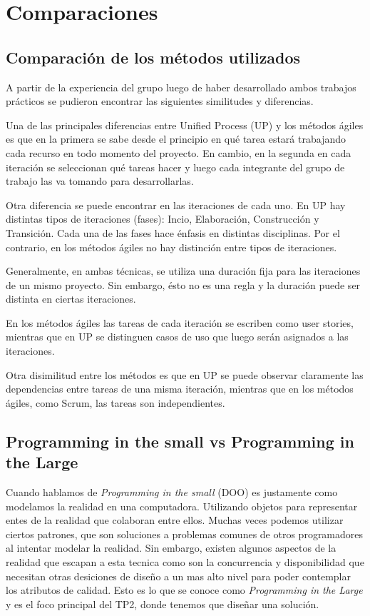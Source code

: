 \section{Comparaciones}

\subsection{Comparación de los métodos utilizados}

A partir de la experiencia del grupo luego de haber desarrollado ambos trabajos prácticos se
pudieron encontrar las siguientes similitudes y diferencias. 


Una de las principales diferencias entre Unified Process (UP) y los métodos ágiles es que en la primera se sabe
desde el principio en qué tarea estará trabajando cada recurso en todo momento
del proyecto. En cambio, en la segunda en cada iteración se seleccionan qué tareas hacer y luego
cada integrante del grupo de trabajo las va tomando para desarrollarlas.


Otra diferencia se puede encontrar en las iteraciones de cada uno. En UP hay distintas
tipos de iteraciones (fases): Incio, Elaboración, Construcción y Transición. Cada una de las fases hace 
énfasis en distintas disciplinas. Por el contrario, en los métodos ágiles no hay distinción entre tipos 
de iteraciones.


Generalmente, en ambas técnicas, se utiliza una duración fija para las iteraciones de un mismo proyecto. 
Sin embargo, ésto no es una regla y la duración puede ser distinta en ciertas iteraciones.


En los métodos ágiles las tareas de cada iteración se escriben como user stories, mientras que en UP
se distinguen casos de uso que luego serán asignados a las iteraciones.


Otra disimilitud entre los métodos es que en UP se puede observar claramente las dependencias entre
tareas de una misma iteración, mientras que en los métodos ágiles, como Scrum, las tareas son independientes.


\subsection{Programming in the small vs Programming in the Large}

Cuando hablamos de \textit{Programming in the small} (DOO) es justamente como modelamos la 
realidad en una computadora. Utilizando objetos para representar entes de la 
realidad que colaboran entre ellos. Muchas veces podemos utilizar ciertos 
patrones, que son soluciones a problemas comunes de otros programadores al 
intentar modelar la realidad.
Sin embargo, existen algunos aspectos de la realidad que escapan a esta tecnica como 
son la concurrencia y disponibilidad que necesitan otras desiciones de diseño a 
un mas alto nivel para poder contemplar los atributos de calidad.
Esto es lo que se conoce como \textit{Programming in the Large} y es el foco principal del TP2,
donde tenemos que diseñar una solución.
